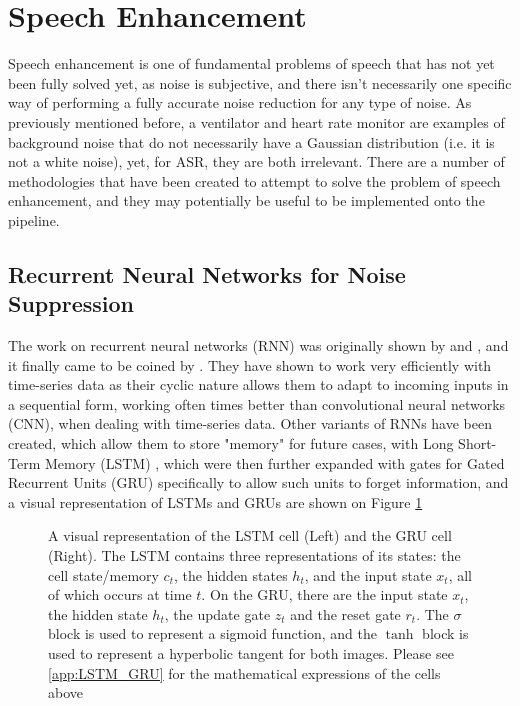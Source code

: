 \section{Speech Enhancement}
Speech enhancement is one of fundamental problems of speech that has not yet been fully solved yet, as noise is subjective, and there isn't necessarily one specific way of performing a fully accurate noise reduction for any type of noise. As previously mentioned before, a ventilator and heart rate monitor are examples of background noise that do not necessarily have a Gaussian distribution (i.e. it is not a white noise), yet, for ASR, they are both irrelevant. There are a number of methodologies that have been created to attempt to solve the problem of speech enhancement, and they may potentially be useful to be implemented onto the pipeline.

\subsection{Recurrent Neural Networks for Noise Suppression} \label{sec:rnn}
The work on recurrent neural networks (RNN) was originally shown by \cite{rnn1} and \cite{rnn2}, and it finally came to be coined by \cite{rnn3}. They have shown to work very efficiently with time-series data as their cyclic nature allows them to adapt to incoming inputs in a sequential form, working often times better than convolutional neural networks (CNN), when dealing with time-series data. Other variants of RNNs have been created, which allow them to store "memory" for future cases, with Long Short-Term Memory (LSTM) \cite{lstm1}, which were then further expanded with gates for Gated Recurrent Units (GRU) \cite{gru1} specifically to allow such units to forget information, and a visual representation of LSTMs and GRUs are shown on Figure \ref{fig::LSTM_GRU}

\begin{figure}[H]
\begin{center}
    \caption{A visual representation of the LSTM cell (Left) and the GRU cell (Right). The LSTM contains three representations of its states: the cell state/memory $c_t$, the hidden states $h_t$, and the input state $x_t$, all of which occurs at time $t$. On the GRU, there are the input state $x_t$, the hidden state $h_t$, the update gate $z_t$ and the reset gate $r_t$. The $\sigma$ block is used to represent a sigmoid function, and the $\tanh$ block is used to represent a hyperbolic tangent for both images. Please see \ref{app:LSTM_GRU} for the mathematical expressions of the cells above}
    \label{fig::LSTM_GRU}
\end{center}
\end{figure}


